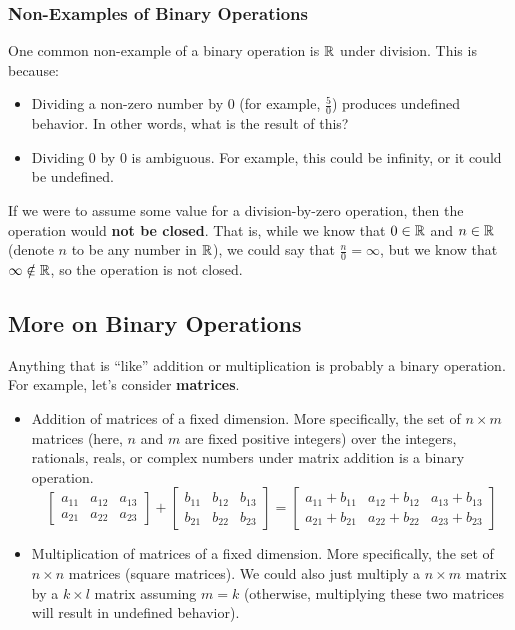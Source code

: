 \documentclass[letterpaper]{article}
\begin{document}
\subsubsection{Non-Examples of Binary Operations}
One common non-example of a binary operation is $\mathbb{R}$ under division. This is because: 
\begin{itemize}
    \item Dividing a non-zero number by 0 (for example, $\frac{5}{0}$) produces undefined behavior. In other words, what is the result of this? 
    \item Dividing 0 by 0 is ambiguous. For example, this could be infinity, or it could be undefined. 
\end{itemize}
If we were to assume some value for a division-by-zero operation, then the operation would \textbf{not be closed}. That is, while we know that $0 \in \mathbb{R}$ and $n \in \mathbb{R}$ (denote $n$ to be any number in $\mathbb{R}$), we could say that $\frac{n}{0} = \infty$, but we know that $\infty \notin \mathbb{R}$, so the operation is not closed.  

\subsection{More on Binary Operations}
Anything that is ``like'' addition or multiplication is probably a binary operation. For example, let's consider \textbf{matrices}.
\begin{itemize}
    \item Addition of matrices of a fixed dimension. More specifically, the set of $n \times m$ matrices (here, $n$ and $m$ are fixed positive integers) over the integers, rationals, reals, or complex numbers under matrix addition is a binary operation.
    \[
        \begin{bmatrix}
            a_{11} & a_{12} & a_{13} \\ 
            a_{21} & a_{22} & a_{23}
        \end{bmatrix} + \begin{bmatrix}
            b_{11} & b_{12} & b_{13} \\ 
            b_{21} & b_{22} & b_{23}
        \end{bmatrix} = \begin{bmatrix}
            a_{11} + b_{11} & a_{12} + b_{12} & a_{13} + b_{13} \\ 
            a_{21} + b_{21} & a_{22} + b_{22} & a_{23} + b_{23}
        \end{bmatrix}
    \]

    \item Multiplication of matrices of a fixed dimension. More specifically, the set of $n \times n$ matrices (square matrices). We could also just multiply a $n \times m$ matrix by a $k \times l$ matrix assuming $m = k$ (otherwise, multiplying these two matrices will result in undefined behavior). 
\end{itemize}
\end{document}
